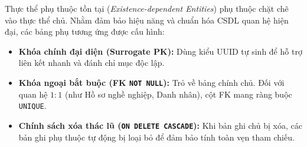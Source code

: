Thực thể phụ thuộc tồn tại (\textit{Existence-dependent Entities}) phụ thuộc chặt chẽ vào thực thể chủ. Nhằm đảm bảo hiệu năng và chuẩn hóa CSDL quan hệ hiện đại, các bảng phụ tương ứng được cấu hình:
\begin{itemize}
    \item \textbf{Khóa chính đại diện (Surrogate PK):} Dùng kiểu UUID tự sinh để hỗ trợ liên kết nhanh và đánh chỉ mục độc lập.
    \item \textbf{Khóa ngoại bắt buộc (FK \texttt{NOT NULL}):} Trỏ về bảng chính chủ. Đối với quan hệ $1:1$ (như Hồ sơ nghề nghiệp, Danh nhân), cột FK mang ràng buộc \texttt{UNIQUE}.
    \item \textbf{Chính sách xóa thác lũ (\texttt{ON DELETE CASCADE}):} Khi bản ghi chủ bị xóa, các bản ghi phụ thuộc tự động bị loại bỏ để đảm bảo tính toàn vẹn tham chiếu.
\end{itemize}

\setlength{\arrayrulewidth}{0.65pt}
\renewcommand{\arraystretch}{1.55}

